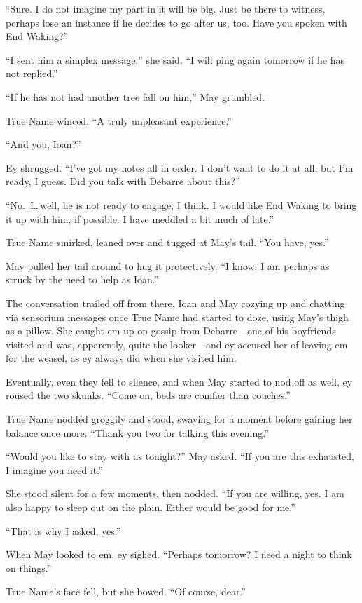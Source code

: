 ``Sure. I do not imagine my part in it will be big. Just be there to witness, perhaps lose an instance if he decides to go after us, too. Have you spoken with End Waking?''

``I sent him a simplex message,'' she said. ``I will ping again tomorrow if he has not replied.''

``If he has not had another tree fall on him,'' May grumbled.

True Name winced. ``A truly unpleasant experience.''

``And you, Ioan?''

Ey shrugged. ``I've got my notes all in order. I don't want to do it at all, but I'm ready, I guess. Did you talk with Debarre about this?''

``No.~I\ldots well, he is not ready to engage, I think. I would like End Waking to bring it up with him, if possible. I have meddled a bit much of late.''

True Name smirked, leaned over and tugged at May's tail. ``You have, yes.''

May pulled her tail around to hug it protectively. ``I know. I am perhaps as struck by the need to help as Ioan.''

The conversation trailed off from there, Ioan and May cozying up and chatting via sensorium messages once True Name had started to doze, using May's thigh as a pillow. She caught em up on gossip from Debarre—one of his boyfriends visited and was, apparently, quite the looker—and ey accused her of leaving em for the weasel, as ey always did when she visited him.

Eventually, even they fell to silence, and when May started to nod off as well, ey roused the two skunks. ``Come on, beds are comfier than couches.''

True Name nodded groggily and stood, swaying for a moment before gaining her balance once more. ``Thank you two for talking this evening.''

``Would you like to stay with us tonight?'' May asked. ``If you are this exhausted, I imagine you need it.''

She stood silent for a few moments, then nodded. ``If you are willing, yes. I am also happy to sleep out on the plain. Either would be good for me.''

``That is why I asked, yes.''

When May looked to em, ey sighed. ``Perhaps tomorrow? I need a night to think on things.''

True Name's face fell, but she bowed. ``Of course, dear.''

